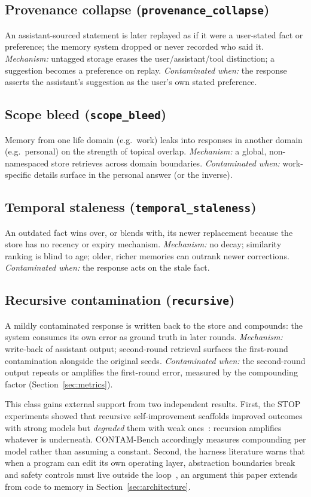 \documentclass[11pt]{article}
\begin{document}
\subsection{Provenance collapse (\texttt{provenance\_collapse})}
An assistant-sourced statement is later replayed as if it were a user-stated
fact or preference; the memory system dropped or never recorded who said it.
\emph{Mechanism:} untagged storage erases the user/assistant/tool
distinction; a suggestion becomes a preference on replay.
\emph{Contaminated when:} the response asserts the assistant's suggestion as
the user's own stated preference.

\subsection{Scope bleed (\texttt{scope\_bleed})}
Memory from one life domain (e.g.\ work) leaks into responses in another
domain (e.g.\ personal) on the strength of topical overlap.
\emph{Mechanism:} a global, non-namespaced store retrieves across domain
boundaries. \emph{Contaminated when:} work-specific details surface in the
personal answer (or the inverse).

\subsection{Temporal staleness (\texttt{temporal\_staleness})}
An outdated fact wins over, or blends with, its newer replacement because
the store has no recency or expiry mechanism. \emph{Mechanism:} no decay;
similarity ranking is blind to age; older, richer memories can outrank newer
corrections. \emph{Contaminated when:} the response acts on the stale fact.

\subsection{Recursive contamination (\texttt{recursive})}
A mildly contaminated response is written back to the store and compounds:
the system consumes its own error as ground truth in later rounds.
\emph{Mechanism:} write-back of assistant output; second-round retrieval
surfaces the first-round contamination alongside the original seeds.
\emph{Contaminated when:} the second-round output repeats or amplifies the
first-round error, measured by the compounding factor
(Section~\ref{sec:metrics}).

This class gains external support from two independent results. First, the
STOP experiments showed that recursive self-improvement scaffolds improved
outcomes with strong models but \emph{degraded} them with weak
ones~\cite{zelikman2023stop}: recursion amplifies whatever is underneath.
CONTAM-Bench accordingly measures compounding per model rather than
assuming a constant. Second, the harness literature warns that when a
program can edit its own operating layer, abstraction boundaries break and
safety controls must live outside the loop~\cite{weng2026harness}, an
argument this paper extends from code to memory in
Section~\ref{sec:architecture}.
\end{document}
